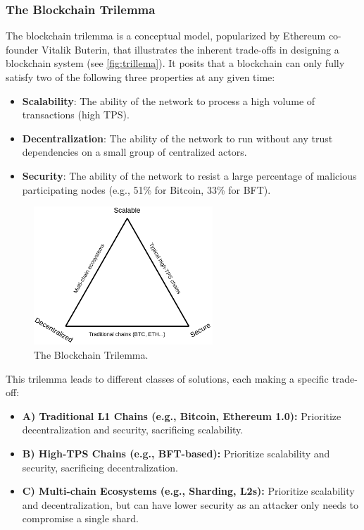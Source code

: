 \subsubsection{The Blockchain
Trilemma}\label{the-blockchain-trilemma}

The blockchain trilemma is a conceptual model, popularized by Ethereum
co-founder Vitalik Buterin, that illustrates the inherent trade-offs in
designing a blockchain system (see \autoref{fig:trillema}). It posits that a blockchain can only
fully satisfy two of the following three properties at any given time:

\begin{itemize}
\tightlist
\item
  \textbf{Scalability}: The ability of the network to process a high
  volume of transactions (high TPS).
\item
  \textbf{Decentralization}: The ability of the network to run without
  any trust dependencies on a small group of centralized actors.
\item
  \textbf{Security}: The ability of the network to resist a large
  percentage of malicious participating nodes (e.g., 51\% for Bitcoin,
  33\% for BFT).
\end{itemize}

\begin{figure}[t]
	\begin{center}
		\includegraphics[width=0.6\textwidth]{./figs/trillema.png}
		\caption{The Blockchain
			Trilemma.}		
		\label{fig:trillema}
	\end{center}	
\end{figure}



This trilemma leads to different classes of solutions, each making a
specific trade-off:

\begin{itemize}
\tightlist
\item
  \textbf{A) Traditional L1 Chains (e.g., Bitcoin, Ethereum 1.0):}
  Prioritize decentralization and security, sacrificing scalability.
\item
  \textbf{B) High-TPS Chains (e.g., BFT-based):} Prioritize scalability
  and security, sacrificing decentralization.
\item
  \textbf{C) Multi-chain Ecosystems (e.g., Sharding, L2s):} Prioritize
  scalability and decentralization, but can have lower security as an
  attacker only needs to compromise a single shard.
\end{itemize}

